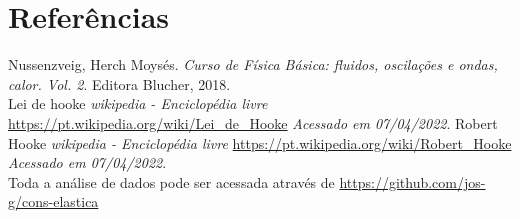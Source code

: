 \documentclass[11pt, article]{abntex2}
\begin{document}
\newpage
\section{Referências}
      Nussenzveig, Herch Moysés. \textit{Curso de Física Básica: fluidos, oscilações e ondas, calor. Vol. 2}. Editora Blucher, 2018.\\
      Lei de hooke \textit{wikipedia - Enciclopédia livre} \url{https://pt.wikipedia.org/wiki/Lei_de_Hooke} \textit{Acessado em 07/04/2022}.
      Robert Hooke \textit{wikipedia - Enciclopédia livre} \url{https://pt.wikipedia.org/wiki/Robert_Hooke} \textit{Acessado em 07/04/2022}.\\
      Toda a análise de dados pode ser acessada através de \url{https://github.com/jos-g/cons-elastica}
\end{document}

